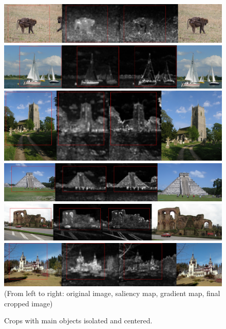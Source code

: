 \begin{figure}
\centering\includegraphics[width=0.9\columnwidth]{../figures/Chen_crops/isolate/IMG_0350.jpg}
\vskip3pt
\centering\includegraphics[width=0.9\columnwidth]{../figures/Chen_crops/refocus/146931510_Large.jpg}
\vskip3pt
\centering\includegraphics[width=0.9\columnwidth]{../figures/Chen_crops/refocus/1845766133_Large.jpg}
\vskip3pt
\centering\includegraphics[width=0.9\columnwidth]{../figures/Chen_crops/refocus/236441280_Large.jpg}
\vskip3pt
\centering\includegraphics[width=0.9\columnwidth]{../figures/Chen_crops/refocus/406813066_Large.jpg}
\vskip3pt
\centering\includegraphics[width=0.9\columnwidth]{../figures/Chen_crops/refocus/420319741_Large.jpg}
\vskip3pt
\small{(From left to right: original image, saliency map, gradient map, final cropped image)}
\caption{Crops with main objects isolated and centered.\label{fig:cropped_refocus}}
\end{figure}

